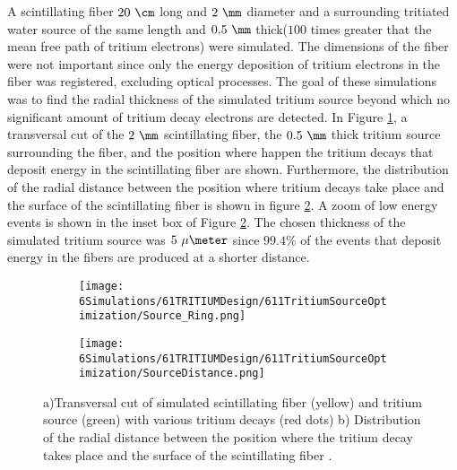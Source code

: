 A scintillating fiber $20~\cm$ long and $2~\mm$ diameter and a surrounding tritiated water source of the same length and $0.5~\mm$ thick($100$ times greater that the mean free path of tritium electrons) were simulated. The dimensions of the fiber were not important since only the energy deposition of tritium electrons in the fiber was registered, excluding optical processes. The goal of these simulations was to find the radial thickness of the simulated tritium source beyond which no significant amount of tritium decay electrons are detected. In Figure \ref{subfig:TransversalCutTritiumSource}, a transversal cut of the $2~\mm$ scintillating fiber, the $0.5~\mm$ thick tritium source surrounding the fiber, and the position where happen the tritium decays that deposit energy in the scintillating fiber are shown. Furthermore, the distribution of the radial distance between the position where tritium decays take place and the surface of the scintillating fiber is shown in figure \ref{subfig:DistanceDistributionTritiumSourceFiber}. A zoom of low energy events is shown in the inset box of Figure \ref{subfig:DistanceDistributionTritiumSourceFiber}. The chosen thickness of the simulated tritium source was $5~\mu\meter$ since $99.4\%$ of the events that deposit energy in the fibers are produced at a shorter distance.

\begin{figure}
\centering
    \begin{subfigure}[b]{0.45\textwidth}
    \centering
    \texttt{[image: 6Simulations/61TRITIUMDesign/611TritiumSourceOptimization/Source\_Ring.png]}  
    \caption{\label{subfig:TransversalCutTritiumSource}}
    \end{subfigure}
    \hfill
    \begin{subfigure}[b]{0.45\textwidth}
    \centering
    \texttt{[image: 6Simulations/61TRITIUMDesign/611TritiumSourceOptimization/SourceDistance.png]}  
    \caption{\label{subfig:DistanceDistributionTritiumSourceFiber}}
    \end{subfigure}
 \caption{a)Transversal cut of simulated scintillating fiber (yellow) and tritium source (green) with various tritium decays (red dots) b) Distribution of the radial distance between the position where the tritium decay takes place and the surface of the scintillating fiber \cite{SimulationPaperCarlos}.}
 \label{fig:TritiumSourceSimulated}
\end{figure}	

